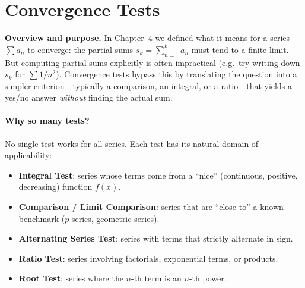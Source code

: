 

\section{Convergence Tests}

\textbf{Overview and purpose.}
In Chapter~4 we defined what it means for a series $\sum a_n$ to converge: the partial sums $s_k=\sum_{n=1}^{k}a_n$ must tend to a finite limit.
But computing partial sums explicitly is often impractical (e.g.\ try writing down $s_k$ for $\sum 1/n^2$).
Convergence tests bypass this by translating the question into a simpler criterion---typically a comparison, an integral, or a ratio---that yields a yes/no answer \emph{without} finding the actual sum.

\paragraph{Why so many tests?}
No single test works for all series. Each test has its natural domain of applicability:
\begin{itemize}[leftmargin=*]
\item \textbf{Integral Test}: series whose terms come from a ``nice'' (continuous, positive, decreasing) function $f(x)$.
\item \textbf{Comparison / Limit Comparison}: series that are ``close to'' a known benchmark ($p$-series, geometric series).
\item \textbf{Alternating Series Test}: series with terms that strictly alternate in sign.
\item \textbf{Ratio Test}: series involving factorials, exponential terms, or products.
\item \textbf{Root Test}: series where the $n$-th term is an $n$-th power.
\end{itemize}

